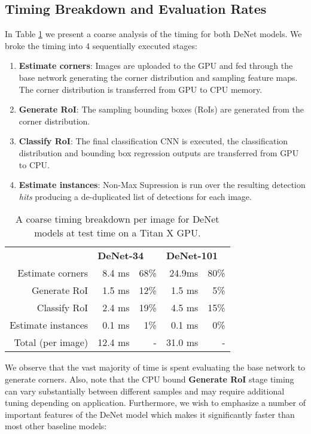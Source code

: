 \documentclass[10pt,twocolumn]{article}
\begin{document}
\subsection{Timing Breakdown and Evaluation Rates} \label{sec:timing_breakdown}

In Table \ref{table:timing_breakdown} we present a coarse analysis of the timing for both DeNet models. We broke the timing into 4 sequentially executed stages:
\begin{enumerate}
\item \textbf{Estimate corners}: Images are uploaded to the GPU and fed through the base network generating the corner distribution and sampling feature maps. The corner distribution is transferred from GPU to CPU memory. 
\item \textbf{Generate RoI}: The sampling bounding boxes (RoIs) are generated from the corner distribution. \item \textbf{Classify RoI}: The final classification CNN is executed, the classification distribution and bounding box regression outputs are transferred from GPU to CPU. 
\item \textbf{Estimate instances}: Non-Max Supression is run over the resulting detection \textit{hits} producing a de-duplicated list of detections for each image. 
\end{enumerate}

\begin{table}[tb]
\begin{center}
\begin{tabular}{rrrrr}
 & \multicolumn{2}{l}{\textbf{DeNet-34}} & \multicolumn{2}{l}{\textbf{DeNet-101}}\\
Estimate corners& 8.4 ms & 68\% & 24.9ms & 80\%  \\
Generate RoI & 1.5 ms & 12\% & 1.5 ms & 5\% \\
Classify RoI & 2.4 ms & 19\% & 4.5 ms & 15\% \\
Estimate instances & 0.1 ms & 1\% & 0.1 ms & 0\% \\
\hline
Total (per image) & 12.4 ms & - & 31.0 ms & - \\
\end{tabular}
\end{center}
\caption{A coarse timing breakdown per image for DeNet models at test time on a Titan X GPU.}
\label{table:timing_breakdown}
\end{table}

We observe that the vast majority of time is spent evaluating the base network to generate corners. Also, note that the CPU bound \textbf{Generate RoI} stage timing can vary substantially between different samples and may require additional tuning depending on application. Furthermore, we wish to emphasize a number of important features of the DeNet model which makes it significantly faster than most other baseline models: 
\end{document}
